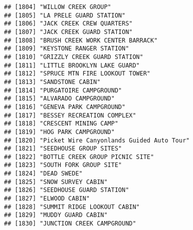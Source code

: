\documentclass[
]{article}
\begin{document}
\begin{verbatim}
## [1804] "WILLOW CREEK GROUP"                                                                  
## [1805] "LA PRELE GUARD STATION"                                                              
## [1806] "JACK CREEK CREW QUARTERS"                                                            
## [1807] "JACK CREEK GUARD STATION"                                                            
## [1808] "BRUSH CREEK WORK CENTER BARRACK"                                                     
## [1809] "KEYSTONE RANGER STATION"                                                             
## [1810] "GRIZZLY CREEK GUARD STATION"                                                         
## [1811] "LITTLE BROOKLYN LAKE GUARD"                                                          
## [1812] "SPRUCE MTN FIRE LOOKOUT TOWER"                                                       
## [1813] "SANDSTONE CABIN"                                                                     
## [1814] "PURGATOIRE CAMPGROUND"                                                               
## [1815] "ALVARADO CAMPGROUND"                                                                 
## [1816] "GENEVA PARK CAMPGROUND"                                                              
## [1817] "BESSEY RECREATION COMPLEX"                                                           
## [1818] "CRESCENT MINING CAMP"                                                                
## [1819] "HOG PARK CAMPGROUND"                                                                 
## [1820] "Picket Wire Canyonlands Guided Auto Tour"                                            
## [1821] "SEEDHOUSE GROUP SITES"                                                               
## [1822] "BOTTLE CREEK GROUP PICNIC SITE"                                                      
## [1823] "SOUTH FORK GROUP SITE"                                                               
## [1824] "DEAD SWEDE"                                                                          
## [1825] "SNOW SURVEY CABIN"                                                                   
## [1826] "SEEDHOUSE GUARD STATION"                                                             
## [1827] "ELWOOD CABIN"                                                                        
## [1828] "SUMMIT RIDGE LOOKOUT CABIN"                                                          
## [1829] "MUDDY GUARD CABIN"                                                                   
## [1830] "JUNCTION CREEK CAMPGROUND"                                                           

\end{verbatim}
\end{document}
